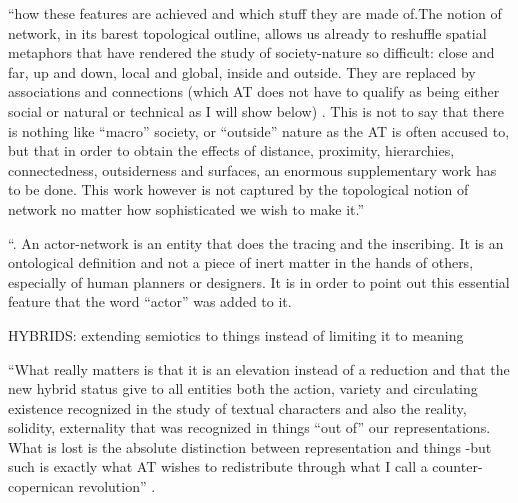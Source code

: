 ``how these features are achieved and which stuff they are made of.The notion of network, in its barest topological outline, allows us already to reshuffle spatial metaphors that have rendered the study of society-nature so difficult: close and far, up and down, local and global, inside and outside. They are replaced by associations and connections (which AT does not have to qualify as being either social or natural or technical as I will show below) . This is not to say that there is nothing like “macro” society, or “outside” nature as the AT is often accused to, but that in order to obtain the effects of distance, proximity, hierarchies, connectedness, outsiderness and surfaces, an enormous supplementary work has to be done. This work however is not captured by the topological notion of network no matter how sophisticated we wish to make it.'' \parencite[6]{Lat90:On}



``. An actor-network is an entity that does the tracing and the inscribing. It is an ontological definition and not a piece of inert matter in the hands of others, especially of human planners or designers. It is in order to point out this essential feature that the word “actor” was added to it. \parencite[7]{Lat90:On}


HYBRIDS: extending semiotics to things instead of limiting it to meaning

``What really matters is that it is an elevation instead of a reduction and that the new hybrid status give to all entities both the action, variety and circulating existence recognized in the study of textual characters and also the reality, solidity, externality that was recognized in things “out of” our representations. What is lost is the absolute distinction between representation and things -but such is exactly what AT wishes to redistribute through what I call a counter-copernican revolution'' \parencite[11]{Lat90:On}.











